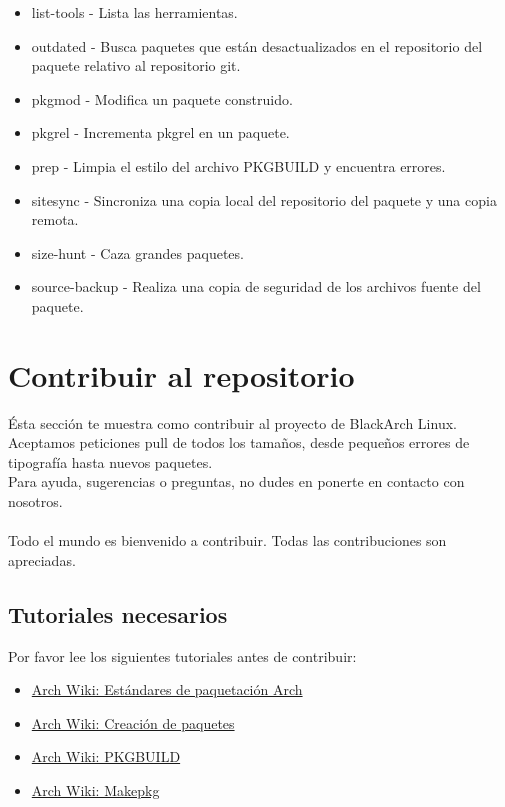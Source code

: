 \documentclass[a4paper, oneside, 11pt]{book}
\def\href#1#2{\htmladdnormallink{#2}{#1}}
\begin{document}
\begin{itemize}
\item list-tools - Lista las herramientas.
\item outdated - Busca paquetes que están desactualizados en el repositorio del paquete
    relativo al repositorio git.
\item pkgmod - Modifica un paquete construido.
\item pkgrel - Incrementa pkgrel en un paquete.
\item prep - Limpia el estilo del archivo PKGBUILD y encuentra errores.
\item sitesync - Sincroniza una copia local del repositorio del paquete y una copia remota.
\item size-hunt - Caza grandes paquetes.
\item source-backup - Realiza una copia de seguridad de los archivos fuente del paquete.
\end{itemize}

\section{Contribuir al repositorio}
Ésta sección te muestra como contribuir al proyecto de BlackArch Linux. 
Aceptamos peticiones pull de todos los tamaños, desde pequeños errores de tipografía
hasta nuevos paquetes. \\Para ayuda, sugerencias o preguntas, no dudes en ponerte en contacto con nosotros.
\\\\
Todo el mundo es bienvenido a contribuir. Todas las contribuciones son apreciadas.

\subsection{Tutoriales necesarios}
Por favor lee los siguientes tutoriales antes de contribuir:
\begin{itemize}
\item \href{https://wiki.archlinux.org/index.php/Arch_packaging_standards_(Espa%C3%B1ol)}{Arch Wiki: Estándares de paquetación Arch}
\item \href{https://wiki.archlinux.org/index.php/Creating_Packages_(Espa%C3%B1ol)}{Arch Wiki: Creación de paquetes}
\item \href{https://wiki.archlinux.org/index.php/PKGBUILD_(Espa%C3%B1ol)}{Arch Wiki: PKGBUILD}
\item \href{https://wiki.archlinux.org/index.php/Makepkg_(Espa%C3%B1ol)}{Arch Wiki: Makepkg}
\end{itemize}
\end{document}
